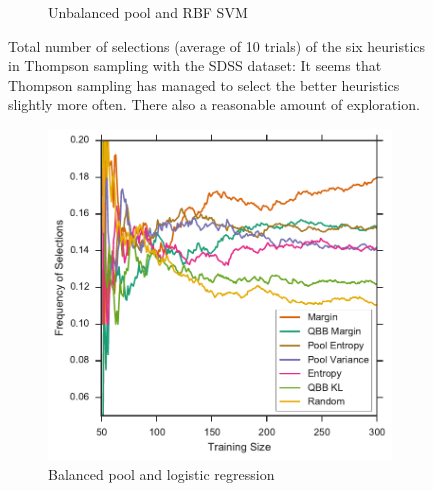 \begin{figure}[p]
\begin{subfigure}{.5\textwidth}
        \caption{Unbalanced pool and RBF SVM}
        \label{fig:sdss_ur_no_selections}
    \end{subfigure}
    \caption[Total number of heuristic selections (SDSS)]{Total number of selections (average of 10
        trials) of the six heuristics in Thompson sampling with the SDSS dataset: It seems that
        Thompson sampling has managed to select the better heuristics slightly more often. There also a
        reasonable amount of exploration.} \label{fig:sdss_no_selections}
\end{figure}


\begin{figure}[p]
	\centering
	\begin{subfigure}{.5\textwidth}
		\centering
		\includegraphics[width=\textwidth]{figures/5_thompson/sdss_bl_frequencies}
		\caption{Balanced pool and logistic regression}
		\label{fig:sdss_bl_frequencies}
	\end{subfigure}%
	\begin{subfigure}{.5\textwidth}
		\centering

\end{subfigure}
\end{figure}
